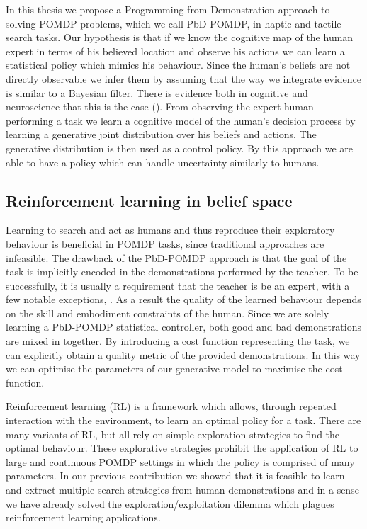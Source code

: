 In this thesis we propose a Programming from Demonstration approach to solving POMDP problems, which we call PbD-POMDP, in
haptic and tactile search tasks. Our hypothesis is that if we know the cognitive map of the human 
expert in terms of his believed location and observe his actions we can learn a statistical policy 
which mimics his behaviour. Since the human's beliefs are not directly observable we infer them 
by assuming that the way we integrate evidence is similar to a Bayesian filter. There is   
evidence both in cognitive and neuroscience that this is the case (\cite{Bake_Saxe_Tene_2011}). From 
observing the expert human performing a task we learn a cognitive model of the human's decision process 
by learning a generative joint distribution over his beliefs and actions. The generative distribution 
is then used as a control policy. By this approach we are able to have a policy which can handle uncertainty
similarly to humans. 

\subsection{Reinforcement learning in belief space}\label{sub:contr2}

Learning to search and act as humans and thus reproduce their exploratory behaviour is beneficial in POMDP tasks, since
traditional approaches are infeasible. The drawback of the PbD-POMDP approach is that the goal of the task is 
implicitly encoded in the demonstrations performed by the teacher. To be successfully, it is usually a requirement 
that the teacher is be an expert, with a few notable exceptions, \cite{rai2013learning}. As a result the quality of 
the learned behaviour depends on the skill and embodiment constraints of the human. Since we are solely learning 
a PbD-POMDP statistical controller, both good and bad demonstrations are mixed in together. By introducing a cost function 
representing the task, we can explicitly obtain a quality metric of the provided demonstrations. In this way we can optimise the 
parameters of our generative model to maximise the cost function.

Reinforcement learning (RL) is a framework which allows, through repeated interaction with the environment, to 
learn an optimal policy for a task. There are many variants of RL, but all rely on simple exploration strategies to find the optimal 
behaviour. These explorative strategies prohibit the application of RL to large and continuous POMDP settings in which the policy 
is comprised of many parameters. In our previous contribution we showed that it is feasible to learn and extract 
multiple search strategies from human demonstrations and in a sense we have already solved the exploration/exploitation dilemma 
which plagues reinforcement learning applications. 

